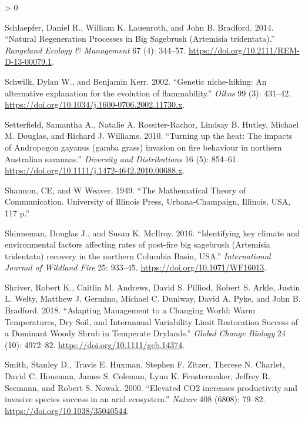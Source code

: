 \documentclass[
  12pt,
]{article}
\newlength{\cslhangindent}
\newenvironment{CSLReferences}[2] %
 {%
  \setlength{\parindent}{0pt}
  \ifodd #1 \everypar{\setlength{\hangindent}{\cslhangindent}}\ignorespaces\fi
  \ifnum #2 > 0
  \setlength{\parskip}{#2\baselineskip}
  \fi
 }%
 {}
\begin{document}
\begin{CSLReferences}{1}{0}
\leavevmode\hypertarget{ref-Schlaepfer2014}{}%
Schlaepfer, Daniel R., William K. Lauenroth, and John B. Bradford. 2014.
{``{Natural Regeneration Processes in Big Sagebrush (Artemisia
tridentata)}.''} \emph{Rangeland Ecology \& Management} 67 (4): 344--57.
\url{https://doi.org/10.2111/REM-D-13-00079.1}.

\leavevmode\hypertarget{ref-Schwilk2002}{}%
Schwilk, Dylan W., and Benjamin Kerr. 2002. {``{Genetic niche-hiking: An
alternative explanation for the evolution of flammability}.''}
\emph{Oikos} 99 (3): 431--42.
\url{https://doi.org/10.1034/j.1600-0706.2002.11730.x}.

\leavevmode\hypertarget{ref-Setterfield2010}{}%
Setterfield, Samantha A., Natalie A. Rossiter-Rachor, Lindsay B. Hutley,
Michael M. Douglas, and Richard J. Williams. 2010. {``{Turning up the
heat: The impacts of Andropogon gayanus (gamba grass) invasion on fire
behaviour in northern Australian savannas}.''} \emph{Diversity and
Distributions} 16 (5): 854--61.
\url{https://doi.org/10.1111/j.1472-4642.2010.00688.x}.

\leavevmode\hypertarget{ref-Shannon1949}{}%
Shannon, CE, and W Weaver. 1949. {``The Mathematical Theory of
Communication. University of Illinois Press, Urbana-Champaign, Illinois,
USA, 117 p.''}

\leavevmode\hypertarget{ref-Shinneman2016}{}%
Shinneman, Douglas J., and Susan K. McIlroy. 2016. {``{Identifying key
climate and environmental factors affecting rates of post-fire big
sagebrush (Artemisia tridentata) recovery in the northern Columbia
Basin, USA}.''} \emph{International Journal of Wildland Fire} 25:
933--45. \url{https://doi.org/10.1071/WF16013}.

\leavevmode\hypertarget{ref-Shriver2018}{}%
Shriver, Robert K., Caitlin M. Andrews, David S. Pilliod, Robert S.
Arkle, Justin L. Welty, Matthew J. Germino, Michael C. Duniway, David A.
Pyke, and John B. Bradford. 2018. {``Adapting Management to a Changing
World: {Warm} Temperatures, Dry Soil, and Interannual Variability Limit
Restoration Success of a Dominant Woody Shrub in Temperate Drylands.''}
\emph{Global Change Biology} 24 (10): 4972--82.
\url{https://doi.org/10.1111/gcb.14374}.

\leavevmode\hypertarget{ref-Smith2000}{}%
Smith, Stanley D., Travis E. Huxman, Stephen F. Zitzer, Therese N.
Charlet, David C. Housman, James S. Coleman, Lynn K. Fenstermaker,
Jeffrey R. Seemann, and Robert S. Nowak. 2000. {``{Elevated CO2
increases productivity and invasive species success in an arid
ecosystem}.''} \emph{Nature} 408 (6808): 79--82.
\url{https://doi.org/10.1038/35040544}.


\end{CSLReferences}
\end{document}
